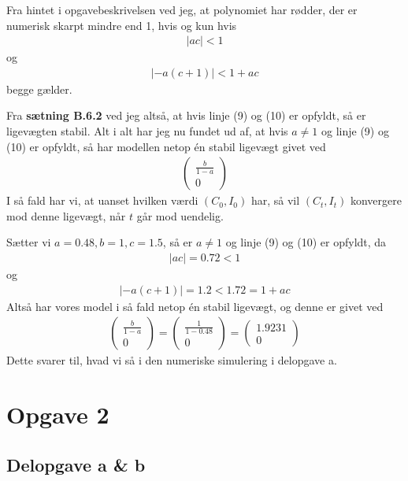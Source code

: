 \documentclass[12pt]{article}
\begin{document}
Fra hintet i opgavebeskrivelsen ved jeg, at polynomiet har rødder, der er numerisk skarpt mindre end 1, hvis og kun hvis
\begin{align}
|ac| < 1
\end{align}
og
\begin{align}
|-a(c+1)| < 1 + ac
\end{align}
begge gælder.

Fra \textbf{sætning B.6.2} ved jeg altså, at hvis linje (9) og (10) er opfyldt, så er ligevægten stabil. Alt i alt har jeg nu fundet ud af, at hvis $a\neq 1$ og linje (9) og (10) er opfyldt, så har modellen netop én stabil ligevægt givet ved 
\begin{align}
\begin{pmatrix}
\frac{b}{1-a} \\
0
\end{pmatrix}
\end{align}
I så fald har vi, at uanset hvilken værdi $(C_0, I_0)$ har, så vil $(C_t,I_t)$ konvergere mod denne ligevægt, når $t$ går mod uendelig.

Sætter vi $a=0.48, b=1, c=1.5$, så er $a\neq 1$ og linje (9) og (10) er opfyldt, da
\begin{align}
|ac| = 0.72 < 1
\end{align}
og 
\begin{align}
|-a(c+1)| = 1.2 < 1.72 = 1 + ac
\end{align}
Altså har vores model i så fald netop én stabil ligevægt, og denne er givet ved
\begin{align}
\begin{pmatrix}
\frac{b}{1-a} \\
0
\end{pmatrix}=
\begin{pmatrix}
\frac{1}{1-0.48} \\
0
\end{pmatrix}= 
\begin{pmatrix}
1.9231 \\
0
\end{pmatrix}
\end{align}
Dette svarer til, hvad vi så i den numeriske simulering i delopgave a.

\section{Opgave 2}

\subsection{Delopgave a \& b}
\end{document}
